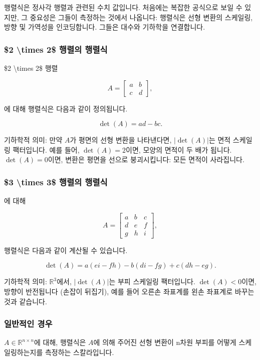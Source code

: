 \documentclass[
  12pt,
  a4paper,
]{article}
\begin{document}
행렬식은 정사각 행렬과 관련된 수치 값입니다. 처음에는 복잡한 공식으로 보일 수 있지만, 그 중요성은 그들이 측정하는 것에서 나옵니다: 행렬식은 선형 변환의 스케일링, 방향 및 가역성을 인코딩합니다. 그들은 대수와 기하학을 연결합니다.

\subsubsection{\$2 \textbackslash times 2\$ 행렬의 행렬식}\label{determinants-of-ux242-times-2ux24-matrices}

\$2 \textbackslash times 2\$ 행렬

\[A = \begin{bmatrix} a & b \\ c & d \end{bmatrix},\]

에 대해 행렬식은 다음과 같이 정의됩니다.

\[\det(A) = ad - bc.\]

기하학적 의미: 만약 \(A\)가 평면의 선형 변환을 나타낸다면, \(|\det(A)|\)는 면적 스케일링 팩터입니다. 예를 들어, \(\det(A) = 2\)이면, 모양의 면적이 두 배가 됩니다. \(\det(A) = 0\)이면, 변환은 평면을 선으로 붕괴시킵니다: 모든 면적이 사라집니다.

\subsubsection{\$3 \textbackslash times 3\$ 행렬의 행렬식}\label{determinants-of-ux243-times-3ux24-matrices}

에 대해

\[A = \begin{bmatrix}
a & b & c \\
d & e & f \\
g & h & i
\end{bmatrix},\]

행렬식은 다음과 같이 계산될 수 있습니다.

\[\det(A) = a(ei - fh) - b(di - fg) + c(dh - eg).\]

기하학적 의미: \(\mathbb{R}^3\)에서, \(|\det(A)|\)는 부피 스케일링 팩터입니다. \(\det(A) < 0\)이면, 방향이 반전됩니다 (손잡이 뒤집기), 예를 들어 오른손 좌표계를 왼손 좌표계로 바꾸는 것과 같습니다.

\subsubsection{일반적인 경우}\label{general-case}

\(A \in \mathbb{R}^{n \times n}\)에 대해, 행렬식은 \(A\)에 의해 주어진 선형 변환이 n차원 부피를 어떻게 스케일링하는지를 측정하는 스칼라입니다.
\end{document}
